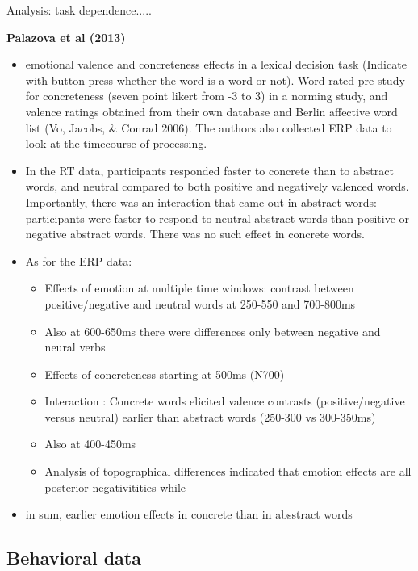 \documentclass[12pt,letterpaper,table,svgnames,dvipsnames]{article}
\begin{document}
Analysis: task dependence.....

\noindent \textbf{Palazova et al (2013)}
\begin{itemize}

    \item emotional valence and concreteness effects in a lexical decision task (Indicate with button press whether the word is a word or not). Word rated pre-study for concreteness (seven point likert from -3 to 3) in a norming study, and valence ratings obtained from their own database and Berlin affective word list (Vo, Jacobs, \& Conrad 2006). The authors also collected ERP data to look at the timecourse of processing. 

    \item In the RT data, participants responded faster to concrete than to abstract words, and neutral compared to both positive and negatively valenced words. Importantly, there was an interaction that came out in abstract words: participants were faster to respond to neutral abstract words than positive or negative abstract words. There was no such effect in concrete words.

    \item As for the ERP data:
        \begin{itemize}
            \item Effects of emotion at multiple time windows: contrast between positive/negative and neutral words at 250-550 and 700-800ms
            \item Also at 600-650ms there were differences only between negative and neural verbs
            \item Effects of concreteness starting at 500ms (N700)
            \item Interaction : Concrete words elicited valence contrasts (positive/negative versus neutral) earlier than abstract words (250-300 vs 300-350ms)
            \item Also at 400-450ms 
            \item Analysis of topographical differences indicated that emotion effects are all posterior negativitities while 
        \end{itemize}

    \item in sum, earlier emotion effects in concrete than in absstract words
\end{itemize}



\subsection{Behavioral data}
\end{document}
